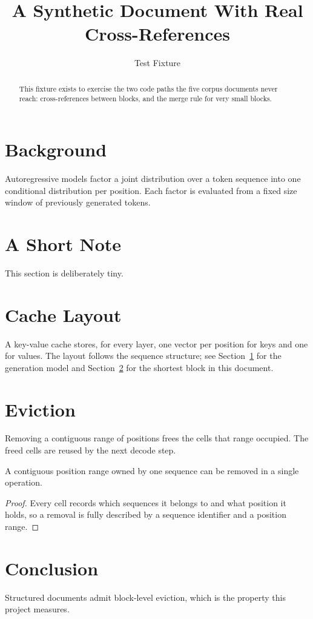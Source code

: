 \documentclass{article}
\title{A Synthetic Document With Real Cross-References}
\author{Test Fixture}
\begin{document}
\maketitle

\begin{abstract}
This fixture exists to exercise the two code paths the five corpus documents
never reach: cross-references between blocks, and the merge rule for very
small blocks.\end{abstract}

\section{Background}
\label{sec:background}

Autoregressive models factor a joint distribution over a token sequence into
one conditional distribution per position. Each factor is evaluated from a
fixed size window of previously generated tokens.

\section{A Short Note}
\label{sec:shortnote}

This section is deliberately tiny.

\section{Cache Layout}
\label{sec:cache}

A key-value cache stores, for every layer, one vector per position for keys and
one for values. The layout follows the sequence structure; see
Section~\ref{sec:background} for the generation model and
Section~\ref{sec:shortnote} for the shortest block in this document.

\section{Eviction}
\label{sec:eviction}

Removing a contiguous range of positions frees the cells that range occupied.
The freed cells are reused by the next decode step.

\begin{theorem}
\label{thm:eviction}
A contiguous position range owned by one sequence can be removed in a single
operation.
\end{theorem}

\begin{proof}
\label{proof:eviction}
Every cell records which sequences it belongs to and what position it holds, so
a removal is fully described by a sequence identifier and a position range.
\end{proof}

\section{Conclusion}
\label{sec:conclusion}

Structured documents admit block-level eviction, which is the property this
project measures.
\end{document}
